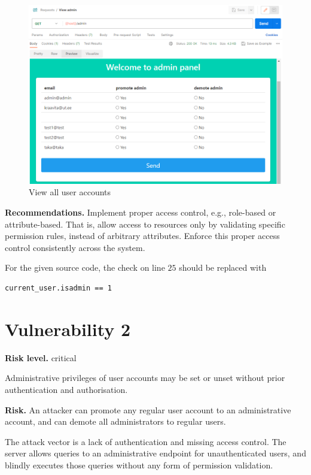 \documentclass[parskip=half]{scrartcl}
\begin{document}
\begin{figure}[h]
    \centering
    \includegraphics[width=\textwidth]{view_admin}
    \caption{View all user accounts}
    \label{fig:viewadm}
\end{figure}

\textbf{Recommendations.} Implement proper access control, e.g., role-based or
attribute-based. That is, allow access to resources only by validating specific
permission rules, instead of arbitrary attributes. Enforce this proper access
control consistently across the system.

For the given source code, the check on line $25$ should be replaced with
\begin{verbatim}
current_user.isadmin == 1
\end{verbatim}

\clearpage
\newpage

\section*{Vulnerability 2}

\textbf{Risk level.} critical

Administrative privileges of user accounts may be set or unset without prior
authentication and authorisation.

\textbf{Risk.} An attacker can promote any regular user account to an
administrative account, and can demote all administrators to regular users.

The attack vector is a lack of authentication and missing access control. The
server allows queries to an administrative endpoint for unauthenticated users,
and blindly executes those queries without any form of permission validation.
\end{document}

